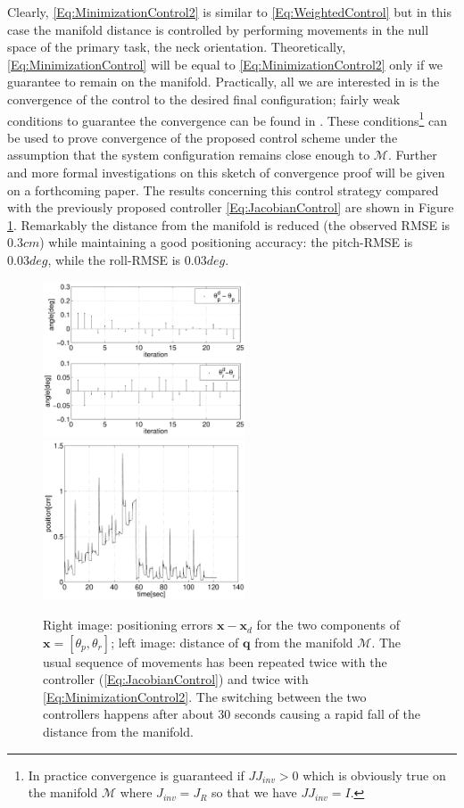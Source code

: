 \documentclass[conference]{IEEEtran}
\numberwithin{equation}{section}
\newcommand{\q}{\mathbf{q}}
\newcommand{\x}{\mathbf{x}}
\begin{document}
Clearly, \eqref{Eq:MinimizationControl2} is similar to \eqref{Eq:WeightedControl} but in this case the manifold distance is controlled by performing movements in the null space of the primary task, the neck orientation. Theoretically, \eqref{Eq:MinimizationControl} will be equal to \eqref{Eq:MinimizationControl2} only if we guarantee to remain on the manifold. Practically, all we are interested in is the convergence of the control to the desired final configuration; fairly weak conditions to guarantee the convergence can be found in \cite{SamsonEspiau}. These conditions\footnote{In practice convergence is guaranteed if $J J_{inv} >0$ which is obviously true on the manifold $\mathcal M$ where $J_{inv} = J_R$ so that we have $J J_{inv} = I$.} can be used to prove convergence of the proposed control scheme under the assumption that the system configuration remains close enough to $\mathcal M$. Further and more formal investigations on this sketch of convergence proof will be given on a forthcoming paper. The results concerning this control strategy compared with the previously proposed controller \eqref{Eq:JacobianControl} are shown in Figure \ref{Fig:ManifoldDistanceJacobianAndMinimization}. Remarkably the distance from the manifold is reduced (the observed RMSE is $0.3cm$) while maintaining a good positioning accuracy: the pitch-RMSE is $0.03deg$, while the roll-RMSE is $0.03deg$.

\begin{figure}[tbp]
\centering 
\includegraphics[width=60mm]{image/JacobianVSMinimizationErrors.pdf} 
\includegraphics[width=60mm]{image/JacobianVSMinimizationDistance.pdf} 
\caption{Right image: positioning errors $\x - \x_d$ for the two components of $\x = [\theta_p, \theta_r]$; left image: distance of $\q$ from the manifold $\mathcal M$. The usual sequence of movements has been repeated twice with the controller (\ref{Eq:JacobianControl}) and twice with \eqref{Eq:MinimizationControl2}. The switching between the two controllers happens after about 30 seconds causing a rapid fall of the distance from the manifold.} 
\label{Fig:ManifoldDistanceJacobianAndMinimization}
\end{figure}
\end{document}
